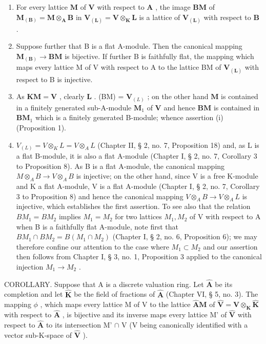 \begin{enumerate}
\def\labelenumi{(\roman{enumi})}
\item
  For every lattice \(\mathbf{M}\) of \(\mathbf{V}\) with respect to \(\mathbf{A}\) , the image \(\mathbf{BM}\) of \(\mathbf{M}_{(\mathbf{B})} = \mathbf{M} \otimes_{\mathbf{A}} \mathbf{B}\) in \(\mathbf{V}_{(\mathbf{L})} = \mathbf{V} \otimes_{\mathbf{K}} \mathbf{L}\) is a lattice of \(\mathbf{V}_{(\mathbf{L})}\) with respect to \(\mathbf{B}\) .
\item
  Suppose further that B is a flat A-module. Then the canonical mapping \(\mathbf{M}_{(\mathbf{B})}\to\mathbf{BM}\) is bijective. If further B is faithfully flat, the mapping which maps every lattice M of V with respect to A to the lattice BM of \(\mathbf{V}_{(\mathbf{L})}\) with respect to B is injective.
\item
  As \(\mathbf{KM} = \mathbf{V}\) , clearly \(\mathbf{L}\) . (BM) = \(\mathbf{V}_{(L)}\) ; on the other hand \(\mathbf{M}\) is contained in a finitely generated sub-A-module \(\mathbf{M}_1\) of \(\mathbf{V}\) and hence \(\mathbf{BM}\) is contained in \(\mathbf{BM}_1\) which is a finitely generated B-module; whence assertion (i) (Proposition 1).
\item
  \(V_{(L)} = V \otimes_{K} L = V \otimes_{A} L\) (Chapter II, § 2, no. 7, Proposition 18) and, as L is a flat B-module, it is also a flat A-module (Chapter I, § 2, no. 7, Corollary 3 to Proposition 8). As B is a flat A-module, the canonical mapping \(M \otimes_{A} B \to V \otimes_{A} B\) is injective; on the other hand, since V is a free K-module and K a flat A-module, V is a flat A-module (Chapter I, § 2, no. 7, Corollary 3 to Proposition 8) and hence the canonical mapping \(V \otimes_{A} B \to V \otimes_{A} L\) is injective, which establishes the first assertion. To see also that the relation \(BM_{1} = BM_{2}\) implies \(M_{1} = M_{2}\) for two lattices \(M_{1}, M_{2}\) of V with respect to A when B is a faithfully flat A-module, note first that \(BM_{1} \cap BM_{2} = B(M_{1} \cap M_{2})\) (Chapter I, § 2, no. 6, Proposition 6); we may therefore confine our attention to the case where \(M_{1} \subset M_{2}\) and our assertion then follows from Chapter I, § 3, no. 1, Proposition 3 applied to the canonical injection \(M_{1} \to M_{2}\) .
\end{enumerate}

COROLLARY. Suppose that A is a discrete valuation ring. Let \(\hat{\mathbf{A}}\) be its completion and let \(\hat{\mathbf{K}}\) be the field of fractions of \(\hat{\mathbf{A}}\) (Chapter VI, § 5, no. 3). The mapping \(\phi\) , which maps every lattice M of V to the lattice \(\hat{\mathbf{A}}\mathbf{M}\) of \(\hat{\mathbf{V}} = \mathbf{V} \otimes_{\mathbf{K}} \hat{\mathbf{K}}\) with respect to \(\hat{\mathbf{A}}\) , is bijective and its inverse maps every lattice M' of \(\hat{\mathbf{V}}\) with respect to \(\hat{\mathbf{A}}\) to its intersection M' \(\cap\) V (V being canonically identified with a vector sub-K-space of \(\hat{\mathbf{V}}\) ).

